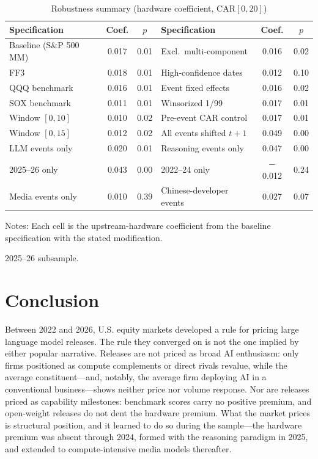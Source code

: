 \documentclass[review,12pt,authoryear]{elsarticle}
\begin{document}
\begin{table}[t!]
\centering
\begin{threeparttable}
\caption{Robustness summary (hardware coefficient, CAR$[0,20]$)}\label{tab:robust}
\small
\begin{tabular}{lcc|lcc}
\toprule
Specification & Coef. & $p$ & Specification & Coef. & $p$ \\
\midrule
Baseline (S\&P 500 MM) & 0.017 & 0.01 & Excl.\ multi-component & 0.016 & 0.02 \\
FF3                    & 0.018 & 0.01 & High-confidence dates  & 0.012 & 0.10 \\
QQQ benchmark          & 0.016 & 0.01 & Event fixed effects    & 0.016 & 0.02 \\
SOX benchmark          & 0.011 & 0.01 & Winsorized 1/99        & 0.017 & 0.01 \\
Window $[0,10]$        & 0.010 & 0.02 & Pre-event CAR control  & 0.017 & 0.01 \\
Window $[0,15]$        & 0.012 & 0.02 & All events shifted $t{+}1$\tnote{a} & 0.049 & 0.00 \\
LLM events only        & 0.020 & 0.01 & Reasoning events only  & 0.047 & 0.00 \\
2025--26 only          & 0.043 & 0.00 & 2022--24 only          & $-$0.012 & 0.24 \\
Media events only      & 0.010 & 0.39 & Chinese-developer events & 0.027 & 0.07 \\
\bottomrule
\end{tabular}
\begin{tablenotes}\footnotesize
\item Notes: Each cell is the upstream-hardware coefficient from the baseline
specification with the stated modification. \item[a] 2025--26 subsample.
\end{tablenotes}
\end{threeparttable}
\end{table}

\section{Conclusion}\label{sec:conclusion}

Between 2022 and 2026, U.S. equity markets developed a rule for pricing large
language model releases. The rule they converged on is not the one implied by
either popular narrative. Releases are not priced as broad AI enthusiasm: only
firms positioned as compute complements or direct rivals revalue, while the
average constituent---and, notably, the average firm deploying AI in a
conventional business---shows neither price nor volume response. Nor are
releases priced as capability milestones: benchmark scores carry no positive
premium, and open-weight releases do not dent the hardware premium. What the
market prices is structural position, and it learned to do so during the
sample---the hardware premium was absent through 2024, formed with the
reasoning paradigm in 2025, and extended to compute-intensive media models
thereafter.
\end{document}
